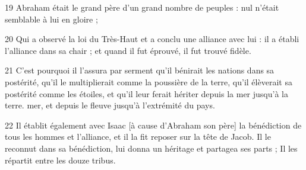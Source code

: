 \par 19 Abraham était le grand père d'un grand nombre de peuples : nul n'était semblable à lui en gloire ;
\par 20 Qui a observé la loi du Très-Haut et a conclu une alliance avec lui : il a établi l'alliance dans sa chair ; et quand il fut éprouvé, il fut trouvé fidèle.
\par 21 C'est pourquoi il l'assura par serment qu'il bénirait les nations dans sa postérité, qu'il le multiplierait comme la poussière de la terre, qu'il élèverait sa postérité comme les étoiles, et qu'il leur ferait hériter depuis la mer jusqu'à la terre. mer, et depuis le fleuve jusqu'à l'extrémité du pays.
\par 22 Il établit également avec Isaac [à cause d'Abraham son père] la bénédiction de tous les hommes et l'alliance, et il la fit reposer sur la tête de Jacob. Il le reconnut dans sa bénédiction, lui donna un héritage et partagea ses parts ; Il les répartit entre les douze tribus.


